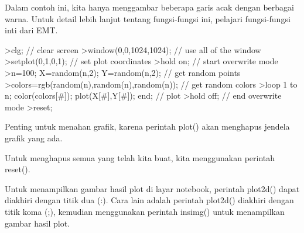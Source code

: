 \documentclass[a4paper,10pt]{article}
\begin{document}
\begin{eulernotebook}
\begin{eulercomment}
\begin{eulercomment}
\begin{eulercomment}
\begin{eulercomment}
\begin{eulercomment}
\begin{eulercomment}
\begin{eulercomment}
\begin{eulercomment}
\begin{eulercomment}
\begin{eulercomment}
\begin{eulercomment}
\begin{eulercomment}
\begin{eulercomment}
\begin{eulercomment}
\begin{eulercomment}
\begin{eulercomment}
\begin{eulercomment}
\begin{eulercomment}
\begin{eulercomment}
\begin{eulercomment}
\begin{eulercomment}
\begin{eulercomment}
\begin{eulercomment}
\begin{eulercomment}
\begin{eulercomment}
\begin{eulercomment}
\begin{eulercomment}
\begin{eulercomment}
\begin{eulercomment}
\begin{eulercomment}
\begin{eulercomment}
\begin{eulercomment}
\begin{eulercomment}
\begin{eulercomment}
\begin{eulercomment}
\begin{eulercomment}
\begin{eulercomment}
Dalam contoh ini, kita hanya menggambar beberapa garis acak dengan
berbagai warna. Untuk detail lebih lanjut tentang fungsi-fungsi ini,
pelajari fungsi-fungsi inti dari EMT.
\end{eulercomment}
\begin{eulerprompt}
>clg; // clear screen
>window(0,0,1024,1024); // use all of the window
>setplot(0,1,0,1); // set plot coordinates
>hold on; // start overwrite mode
>n=100; X=random(n,2); Y=random(n,2);  // get random points
>colors=rgb(random(n),random(n),random(n)); // get random colors
>loop 1 to n; color(colors[#]); plot(X[#],Y[#]); end; // plot
>hold off; // end overwrite mode
>reset;
\end{eulerprompt}
\begin{eulercomment}
Penting untuk menahan grafik, karena perintah plot() akan menghapus
jendela grafik yang ada.

Untuk menghapus semua yang telah kita buat, kita menggunakan perintah
reset().

Untuk menampilkan gambar hasil plot di layar notebook, perintah
plot2d() dapat diakhiri dengan titik dua (:). Cara lain adalah
perintah plot2d() diakhiri dengan titik koma (;), kemudian menggunakan
perintah insimg() untuk menampilkan gambar hasil plot.


\end{eulercomment}
\end{eulercomment}
\end{eulercomment}
\end{eulercomment}
\end{eulercomment}
\end{eulercomment}
\end{eulercomment}
\end{eulercomment}
\end{eulercomment}
\end{eulercomment}
\end{eulercomment}
\end{eulercomment}
\end{eulercomment}
\end{eulercomment}
\end{eulercomment}
\end{eulercomment}
\end{eulercomment}
\end{eulercomment}
\end{eulercomment}
\end{eulercomment}
\end{eulercomment}
\end{eulercomment}
\end{eulercomment}
\end{eulercomment}
\end{eulercomment}
\end{eulercomment}
\end{eulercomment}
\end{eulercomment}
\end{eulercomment}
\end{eulercomment}
\end{eulercomment}
\end{eulercomment}
\end{eulercomment}
\end{eulercomment}
\end{eulercomment}
\end{eulercomment}
\end{eulercomment}
\end{eulernotebook}
\end{document}
